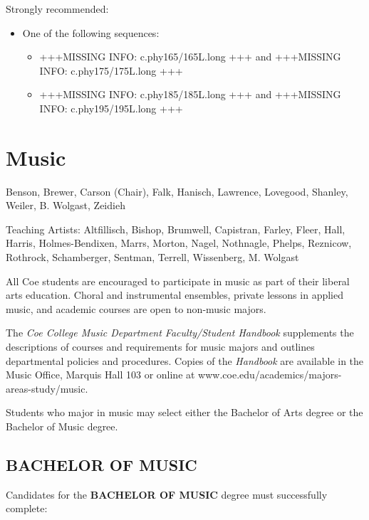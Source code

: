 \documentclass[
  letterpaper,
]{scrbook}
\providecommand{\tightlist}{%
  \setlength{\itemsep}{0pt}\setlength{\parskip}{0pt}}
\begin{document}
Strongly recommended:

\begin{itemize}
\tightlist
\item
  One of the following sequences:

  \begin{itemize}
  \tightlist
  \item
    +++MISSING INFO: c.phy165/165L.long +++ and +++MISSING INFO:
    c.phy175/175L.long +++
  \item
    +++MISSING INFO: c.phy185/185L.long +++ and +++MISSING INFO:
    c.phy195/195L.long +++
  \end{itemize}
\end{itemize}

\section{Music}\label{sec-music}

Benson, Brewer, Carson (Chair), Falk, Hanisch, Lawrence, Lovegood,
Shanley, Weiler, B. Wolgast, Zeidieh

Teaching Artists: Altfillisch, Bishop, Brumwell, Capistran, Farley,
Fleer, Hall, Harris, Holmes-Bendixen, Marrs, Morton, Nagel, Nothnagle,
Phelps, Reznicow, Rothrock, Schamberger, Sentman, Terrell, Wissenberg,
M. Wolgast

All Coe students are encouraged to participate in music as part of their
liberal arts education. Choral and instrumental ensembles, private
lessons in applied music, and academic courses are open to non-music
majors.

The \emph{Coe College Music Department Faculty/Student Handbook}
supplements the descriptions of courses and requirements for music
majors and outlines departmental policies and procedures. Copies of the
\emph{Handbook} are available in the Music Office, Marquis Hall 103 or
online at www.coe.edu/academics/majors-areas-study/music.

Students who major in music may select either the Bachelor of Arts
degree or the Bachelor of Music degree.

\subsection{BACHELOR OF MUSIC}\label{bachelor-of-music}

Candidates for the \textbf{BACHELOR OF MUSIC} degree must successfully
complete:
\end{document}
